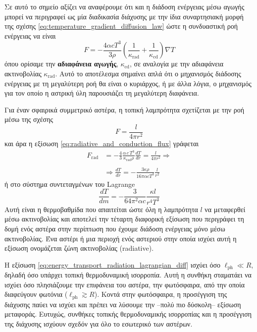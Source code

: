 Σε αυτό το σημείο αξίζει να αναφέρουμε ότι και η διάδοση ενέργειας μέσω αγωγής μπορεί να περιγραφεί ως μία διαδικασία διάχυσης με την ίδια συναρτησιακή μορφή της σχέσης \eqref{eq:temperature_gradient_diffusion_law} ώστε η συνδυαστική ροή ενέργειας να είναι
\begin{equation}
    \label{eq:radiative_and_conduction_flux}
    F = - \frac{4\alpha c T^3}{3\rho}\left( \frac{1}{\kappa_{\text{rad}}} + \frac{1}{\kappa_{\text{cd}}} \right) \nabla T
\end{equation}
όπου ορίσαμε την \textbf{αδιαφάνεια αγωγής}, $\kappa_{\text{cd}}$, σε αναλογία με την αδιαφάνεια ακτινοβολίας $\kappa_{\text{rad}}$. Αυτό το αποτέλεσμα σημαίνει απλά ότι ο μηχανισμός διάδοσης ενέργειας με τη μεγαλύτερη ροή θα είναι ο κυριάρχος, ή με άλλα λόγια, ο μηχανισμός για τον οποίο η αστρική ύλη παρουσιάζει τη μεγαλύτερη διαφάνεια.

Για έναν σφαιρικά συμμετρικό αστέρα, η τοπική λαμπρότητα σχετίζεται με την ροή μέσω της σχέσης 
$$F = \frac{l}{4\pi r^2}$$
και άρα η εξίσωση \eqref{eq:radiative_and_conduction_flux} γράφεται
\begin{align}
    \label{eq:energy_transport_radiation_eulerian_diff}
    \nonumber F_{\text{rad}} &= - \frac{4}{3} \frac{\alpha \,c \,T^3}{\kappa_{\text{rad}} \rho} \frac{dT}{dr} = \frac{l}{4\pi r^2} \Rightarrow \\ \nonumber \\
    &\Rightarrow \boxed{\frac{dT}{dr} = - \frac{3\kappa \rho}{16 \pi \alpha c T^3} \frac{l}{r^2}}
\end{align}
ή στο σύστημα συντεταγμένων του Lagrange
\begin{equation}
    \label{eq:energy_transport_radiation_lagrangian_diff}
    \boxed{\frac{dT}{dm} = - \frac{3}{64\pi^2 \alpha c} \frac{\kappa l}{r^4 T^3}}
\end{equation}
Αυτή είναι η θερμοβαθμίδα που απαιτείται ώστε όλη η λαμπρότητα $l$ να μεταφερθεί μέσω ακτινοβολίας και αποτελεί την τέταρτη διαφορική εξίσωση που περιγράφει τη δομή ενός αστέρα στην περίπτωση που έχουμε διάδοση ενέργειας μόνο μέσω ακτινοβολίας. Ένα αστέρι ή μια περιοχή ενός αστεριού στην οποία ισχύει αυτή η εξίσωση ονομάζεται ζώνη ακτινοβολίας (radiative).

Η εξίσωση \eqref{eq:energy_transport_radiation_lagrangian_diff} ισχύει όσο $\ell_{\text{ph}} \ll R$, δηλαδή όσο υπάρχει τοπική θερμοδυναμική ισορροπία. Αυτή η συνθήκη σταματάει να ισχύει όσο πλησιάζουμε την επιφάνεια του αστέρα, την φωτόσφαιρα, από την οποία διαφεύγουν φωτόνια ($\ell_{\text{ph}} \gtrsim R$). Κοντά στην φωτόσφαιρα, η προσέγγιση της διάχυσης παύει να ισχύει και πρέπει να λύσουμε την --πολύ πιο δύσκολη-- εξίσωση μεταφοράς. Ευτυχώς, συνθήκες τοπικής θερμοδυναμικής ισορροπίας και η προσέγγιση της διάχυσης ισχύουν σχεδόν για όλο το εσωτερικό των αστέρων.

